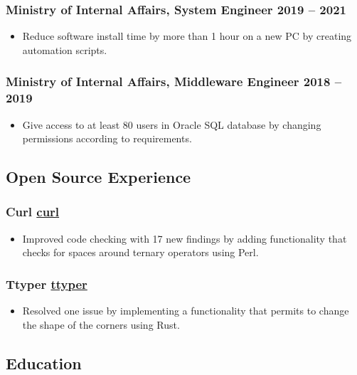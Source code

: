 \documentclass[a4paper,12pt]{article}
\begin{document}
\subsubsection*{\textbf{Ministry of Internal Affairs}, System Engineer \hfill 2019 -- 2021}
\label{sec:orgb36cc9f}
\begin{itemize}
\item Reduce software install time by more than 1 hour on a new PC by creating automation scripts.
\end{itemize}
\subsubsection*{\textbf{Ministry of Internal Affairs}, Middleware Engineer \hfill 2018 -- 2019}
\label{sec:orgcdf6816}
\begin{itemize}
\item Give access to at least 80 users in Oracle SQL database by changing permissions according
to requirements.
\end{itemize}
\subsection*{\textbf{Open Source Experience}}
\label{sec:org789a2d7}
\subsubsection*{\textbf{Curl} \hfill \href{https://github.com/curl/curl}{curl}}
\label{sec:org469098c}
\begin{itemize}
\item Improved code checking with 17 new findings by adding functionality
that checks for spaces around ternary operators using Perl.
\end{itemize}
\subsubsection*{\textbf{Ttyper} \hfill \href{https://github.com/maxniederman/ttyper}{ttyper}}
\label{sec:org17f682a}
\begin{itemize}
\item Resolved one issue by implementing a functionality that permits to change the shape of the corners using Rust.
\end{itemize}
\subsection*{\textbf{Education}}
\label{sec:org59497bd}
\end{document}
